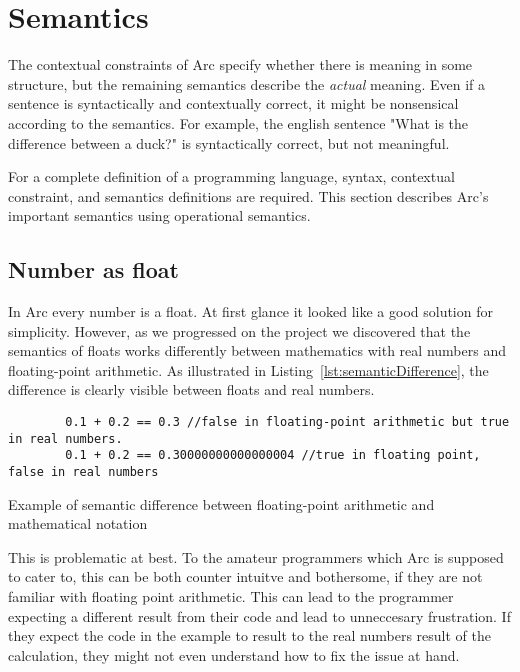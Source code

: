 \section{Semantics}\label{sec:languagesemantics}
The contextual constraints of Arc specify whether there is meaning in some structure, but the remaining semantics describe the \textit{actual} meaning. Even if a sentence is syntactically and contextually correct, it might be nonsensical according to the semantics. For example, the english sentence "What is the difference between a duck?" is syntactically correct, but not meaningful.

For a complete definition of a programming language, syntax, contextual constraint, and semantics definitions are required. This section describes Arc's important semantics using operational semantics.


\subsection{Number as float}\label{subsec:numberAsFloats}
In Arc every number is a float. At first glance it looked like a good solution for simplicity. However, as we progressed on the project we discovered that the semantics of floats works differently between mathematics with real numbers and floating-point arithmetic. As illustrated in Listing~\ref{lst:semanticDifference}, the difference is clearly visible between floats and real numbers.


\begin{listing}[htb!]
    \begin{verbatim}
        0.1 + 0.2 == 0.3 //false in floating-point arithmetic but true in real numbers.
        0.1 + 0.2 == 0.30000000000000004 //true in floating point, false in real numbers
    \end{verbatim}
    \caption{Example of semantic difference between floating-point arithmetic and mathematical notation}
    \label{lst:semanticDifference}
\end{listing}



This is problematic at best. To the amateur programmers which Arc is supposed to cater to, this can be both counter intuitve and bothersome, if they are not familiar with floating point arithmetic. This can lead to the programmer expecting a different result from their code and lead to unneccesary frustration. If they expect the code in the example to result to the real numbers result of the calculation, they might not even understand how to fix the issue at hand.

